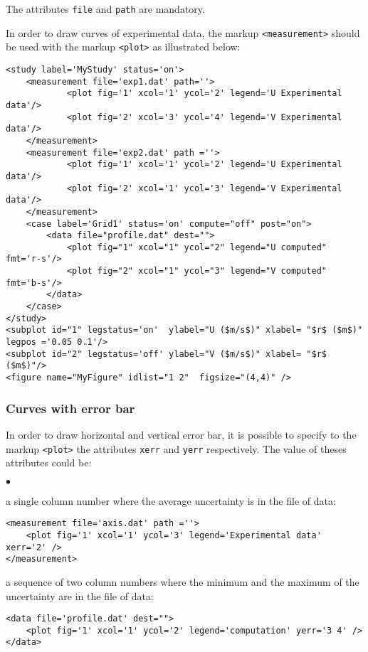 \documentclass[a4paper,10pt,twoside]{csshortdoc}
\begin{document}
The attributes \texttt{file} and \texttt{path} are mandatory.

In order to draw curves of experimental data, the markup \texttt{<measurement>}
should be used with the markup \texttt{<plot>} as illustrated below:

\small
\begin{verbatim}
<study label='MyStudy' status='on'>
    <measurement file='exp1.dat' path=''>
            <plot fig='1' xcol='1' ycol='2' legend='U Experimental data'/>
            <plot fig='2' xcol='3' ycol='4' legend='V Experimental data'/>
    </measurement>
    <measurement file='exp2.dat' path =''>
            <plot fig='1' xcol='1' ycol='2' legend='U Experimental data'/>
            <plot fig='2' xcol='1' ycol='3' legend='V Experimental data'/>
    </measurement>
    <case label='Grid1' status='on' compute="off" post="on">
        <data file="profile.dat" dest="">
            <plot fig="1" xcol="1" ycol="2" legend="U computed" fmt='r-s'/>
            <plot fig="2" xcol="1" ycol="3" legend="V computed" fmt='b-s'/>
        </data>
    </case>
</study>
<subplot id="1" legstatus='on'  ylabel="U ($m/s$)" xlabel= "$r$ ($m$)" legpos ='0.05 0.1'/>
<subplot id="2" legstatus='off' ylabel="V ($m/s$)" xlabel= "$r$ ($m$)"/>
<figure name="MyFigure" idlist="1 2"  figsize="(4,4)" />
\end{verbatim}
\normalsize

\subsubsection{Curves with error bar}\label{sec:err}

In order to draw horizontal and vertical error bar, it is possible to
specify to the markup \texttt{<plot>} the attributes \texttt{xerr} and
\texttt{yerr} respectively. The value of theses attributes could be:
\begin{list}{$\bullet$}{}
\item a single column number where the average uncertainty is in the file of
data:
\small
\begin{verbatim}
<measurement file='axis.dat' path =''>
    <plot fig='1' xcol='1' ycol='3' legend='Experimental data' xerr='2' />
</measurement>
\end{verbatim}
\normalsize
\item a sequence of two column numbers where the minimum and the maximum
of the uncertainty are in the file of data:
\small
\begin{verbatim}
<data file='profile.dat' dest="">
    <plot fig='1' xcol='1' ycol='2' legend='computation' yerr='3 4' />
</data>
\end{verbatim}
\normalsize
\end{list}
\end{document}
